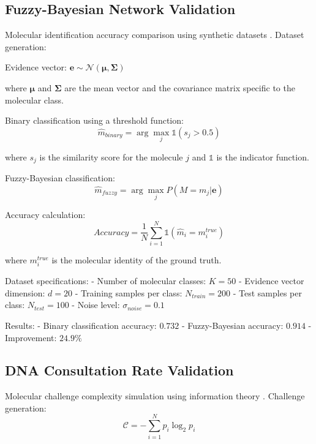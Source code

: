 \documentclass[12pt,a4paper]{article}
\begin{document}
\subsection{Fuzzy-Bayesian Network Validation}

Molecular identification accuracy comparison using synthetic datasets \cite{hand2001idiot}. Dataset generation:

Evidence vector: $\mathbf{e} \sim \mathcal{N}(\boldsymbol{\mu}, \boldsymbol{\Sigma})$

where $\boldsymbol{\mu}$ and $\boldsymbol{\Sigma}$ are the mean vector and the covariance matrix specific to the molecular class.

Binary classification using a threshold function:
\begin{equation}
\hat{m}_{binary} = \arg\max_j \mathbb{1}(s_j > 0.5)
\end{equation}

where $s_j$ is the similarity score for the molecule $j$ and $\mathbb{1}$ is the indicator function.

Fuzzy-Bayesian classification:
\begin{equation}
\hat{m}_{fuzzy} = \arg\max_j P(M = m_j | \mathbf{e})
\end{equation}

Accuracy calculation:
\begin{equation}
Accuracy = \frac{1}{N} \sum_{i=1}^N \mathbb{1}(\hat{m}_i = m_i^{true})
\end{equation}

where $m_i^{true}$ is the molecular identity of the ground truth.

Dataset specifications:
- Number of molecular classes: $K = 50$
- Evidence vector dimension: $d = 20$
- Training samples per class: $N_{train} = 200$
- Test samples per class: $N_{test} = 100$
- Noise level: $\sigma_{noise} = 0.1$

Results:
- Binary classification accuracy: $0.732$
- Fuzzy-Bayesian accuracy: $0.914$
- Improvement: $24.9\%$

\subsection{DNA Consultation Rate Validation}

Molecular challenge complexity simulation using information theory \cite{shannon1948mathematical}. Challenge generation:
\begin{equation}
\mathcal{C} = -\sum_{i=1}^N p_i \log_2 p_i
\end{equation}
\end{document}
